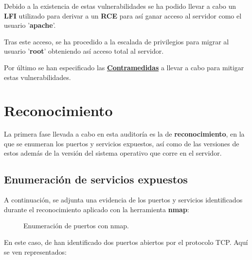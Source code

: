 \documentclass[a4paper]{article} %
\begin{document}
    Debido a la existencia de estas vulnerabilidades se ha podido llevar a cabo un \textbf{LFI} utilizado para derivar a un \textbf{RCE} para así ganar acceso al servidor como el usuario '\textbf{apache}'.

    Tras este acceso, se ha procedido a la escalada de privilegios para migrar al usuario '\textbf{root}' obteniendo así acceso total al servidor.

    Por último se han especificado las \hyperref[sec:contramedidas]{\textbf{Contramedidas}} a llevar a cabo para mitigar estas vulnerabilidades.

  \clearpage

  \section{Reconocimiento}\label{sec:reconocimiento}
    La primera fase llevada a cabo en esta auditoría es la de \textbf{reconocimiento}, en la que se enumeran los puertos y servicios expuestos, así como de las versiones de estos además de la versión del sistema operativo que corre en el servidor.
  \subsection{Enumeración de servicios expuestos}
    A continuación, se adjunta una evidencia de los puertos y servicios identificados durante el reconocimiento aplicado con la herramienta \textbf{nmap}:


  \begin{figure}[h]
    \centering
    \setlength{\fboxrule}{0.8pt}
    \caption{Enumeración de puertos con nmap.}
  \end{figure}


  En este caso, de han identificado dos puertos abiertos por el protocolo TCP. Aquí se ven representados:

  \vspace{0.5cm}

  \centering

  \vspace{0.5cm}
\end{document}
